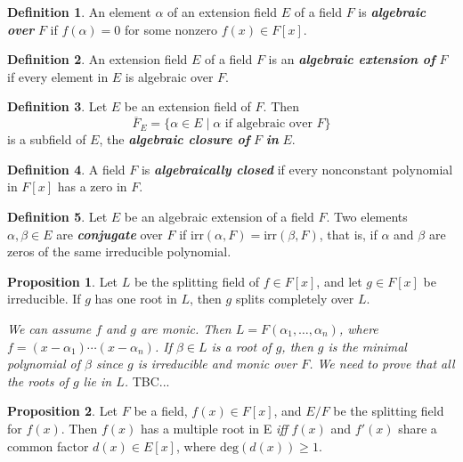 \documentclass{article}
\makeatletter
\theoremstyle{definition}
\newtheorem{prop}{Proposition}
\newtheorem{definition}{Definition}
\theoremstyle{remark}
\let\oldproofname=\proofname
\renewcommand{\proofname}{\bf{\textit{\oldproofname}}}
\theoremstyle{definition}
\renewenvironment{proof}[1][\proofname]{\par
  \pushQED{\qed}%
  \normalfont \topsep6\p@\@plus6\p@\relax
  \list{}{\leftmargin=0mm
          \rightmargin=0mm
          \settowidth{\itemindent}{\itshape#1}%
          \labelwidth=4mm
          \parsep=0pt \listparindent=0mm%
  }
  \item[\hskip\labelsep
        \itshape
    #1\@addpunct{.}]\ignorespaces
}{%
  \popQED\endlist\@endpefalse
}
\makeatother
\begin{document}
    \begin{definition}\label{def:2}
        An element $\alpha$ of an extension field $E$ of a field $F$ is \textbf{\textit{algebraic over}} $F$ if $f(\alpha)=0$ for some nonzero $f(x)\in F[x]$.
    \end{definition}
    \begin{definition}\label{def:3}
        An extension field $E$ of a field $F$ is an \textbf{\textit{algebraic extension of}} $F$ if every element in $E$ is algebraic over $F$.
    \end{definition}
    \begin{definition}\label{def:4}
        Let $E$ be an extension field of $F$. Then
            \begin{equation*}
                \overline{F}_E=\{\alpha\in E\mid \alpha\text{ if algebraic over } F\}
            \end{equation*}
        is a subfield of $E$, the \textbf{\textit{algebraic closure of}} $F$ \textbf{\textit{in}} $E$.
    \end{definition}
    \begin{definition}\label{def:5}
        A field $F$ is \textbf{\textit{algebraically closed}} if every nonconstant polynomial in $F[x]$ has a zero in $F$.
    \end{definition}
    \begin{definition}\label{def:6}
        Let $E$ be an algebraic extension of a field $F$. Two elements $\alpha,\beta\in E$ are \textbf{\textit{conjugate}} over $F$ if irr$(\alpha,F)=$irr$(\beta,F)$, that is, if $\alpha$ and $\beta$ are zeros of the same irreducible polynomial.
    \end{definition}
    \begin{prop}\label{prop:2}
        Let $L$ be the splitting field of $f\in F[x]$, and let $g\in F[x]$ be irreducible. If $g$ has one root in $L$, then $g$ splits completely over $L$.
    \end{prop}
        \begin{proof}
            \emph{We can assume $f$ and $g$ are monic. Then $L=F(\alpha_1,\dots, \alpha_n)$, where $f=(x-\alpha_1)\cdots(x-\alpha_n)$. If $\beta\in L$ is a root of $g$, then $g$ is the minimal polynomial of $\beta$ since $g$ is irreducible and monic over $F$. We need to prove that all the roots of $g$ lie in $L$. }TBC...
        \end{proof}
    \begin{prop}\label{prop:3}
        Let $F$ be a field, $f(x)\in F[x]$, and $E/F$ be the splitting field for $f(x)$. Then $f(x)$ has a multiple root in E \textit{iff} $f(x)$ and $f'(x)$ share a common factor $d(x)\in E[x]$, where $\text{deg}(d(x))\geq 1$. 
    \end{prop}
\end{document}

